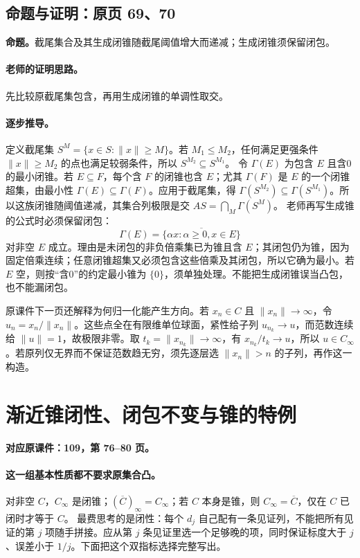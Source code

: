 \documentclass[11pt,a4paper]{article}
\theoremstyle{definition}\newtheorem{definition}{定义}\newtheorem{example}{例}
\begin{document}
\subsection{命题与证明：原页 69、70}

\textbf{命题。}截尾集合及其生成闭锥随截尾阈值增大而递减；生成闭锥须保留闭包。

\paragraph{老师的证明思路。}先比较原截尾集包含，再用生成闭锥的单调性取交。

\paragraph{逐步推导。}
定义截尾集 $S^M=\{x\in S:\|x\|\ge M\}$。若 $M_1\le M_2$，任何满足更强条件 $\|x\|\ge M_2$ 的点也满足较弱条件，所以 $S^{M_2}\subseteq S^{M_1}$。
令 $\Gamma(E)$ 为包含 $E$ 且含0的最小闭锥。若 $E\subseteq F$，每个含 $F$ 的闭锥也含 $E$；尤其 $\Gamma(F)$ 是 $E$ 的一个闭锥超集，由最小性 $\Gamma(E)\subseteq\Gamma(F)$。应用于截尾集，得 $\Gamma(S^{M_2})\subseteq\Gamma(S^{M_1})$。所以这族闭锥随阈值递减，其集合列极限是交 $A S=\bigcap_M\Gamma(S^M)$。
老师再写生成锥的公式时必须保留闭包：
\[\Gamma(E)=\overline{\{\alpha x:\alpha\ge0,x\in E\}}\]
对非空 $E$ 成立。理由是未闭包的非负倍乘集已为锥且含 $E$；其闭包仍为锥，因为固定倍乘连续；任意闭锥超集又必须包含这些倍乘及其闭包，所以它确为最小。若 $E$ 空，则按“含0”的约定最小锥为 $\{0\}$，须单独处理。不能把生成闭锥误当凸包，也不能漏闭包。

原课件下一页还解释为何归一化能产生方向。若 $x_n\in C$ 且 $\|x_n\|\to\infty$，令 $u_n=x_n/\|x_n\|$。这些点全在有限维单位球面，紧性给子列 $u_{n_k}\to u$，而范数连续给 $\|u\|=1$，故极限非零。取 $t_k=\|x_{n_k}\|\to\infty$，有 $x_{n_k}/t_k\to u$，所以 $u\in C_\infty$。若原列仅无界而不保证范数趋无穷，须先逐层选 $\|x_n\|>n$ 的子列，再作这一构造。


\clearpage\section{渐近锥闭性、闭包不变与锥的特例}\label{g:109:76}

\textbf{对应原课件：109，第 76--80 页。}


\paragraph{这一组基本性质都不要求原集合凸。}
对非空 $C$，$C_\infty$ 是闭锥；$(\overline C)_\infty=C_\infty$；若 $C$ 本身是锥，则 $C_\infty=\overline C$，仅在 $C$ 已闭时才等于 $C$。
最费思考的是闭性：每个 $d_j$ 自己配有一条见证列，不能把所有见证的第 $j$ 项随手拼接。应从第 $j$ 条见证里选一个足够晚的项，同时保证标度大于 $j$、误差小于 $1/j$。下面把这个双指标选择完整写出。
\end{document}
